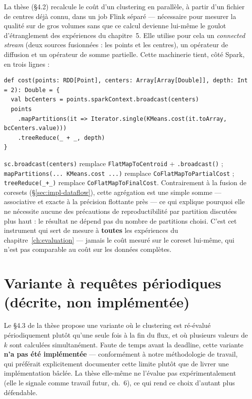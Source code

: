 La thèse (§4.2) recalcule le coût d'un clustering en parallèle, à partir
d'un fichier de centres déjà connu, dans un job Flink séparé --- nécessaire
pour mesurer la qualité sur de gros volumes sans que ce calcul devienne
lui-même le goulot d'étranglement des expériences du chapitre~5. Elle utilise
pour cela un \emph{connected stream} (deux sources fusionnées : les points
et les centres), un opérateur de diffusion et un opérateur de somme partielle.
Cette machinerie tient, côté Spark, en trois lignes :

\begin{verbatim}
def cost(points: RDD[Point], centers: Array[Array[Double]], depth: Int = 2): Double = {
  val bcCenters = points.sparkContext.broadcast(centers)
  points
    .mapPartitions(it => Iterator.single(KMeans.cost(it.toArray, bcCenters.value)))
    .treeReduce(_ + _, depth)
}
\end{verbatim}

\texttt{sc.broadcast(centers)} remplace \texttt{FlatMapToCentroid} +
\texttt{.broadcast()} ; \texttt{mapPartitions(... KMeans.cost ...)} remplace
\texttt{CoFlatMapToPartialCost} ; \texttt{treeReduce(\_+\_)} remplace
\texttt{CoFlatMapToFinalCost}. Contrairement à la fusion de coresets
(§\ref{sec:impl-dataflow}), cette agrégation est une simple somme ---
associative et exacte à la précision flottante près --- ce qui explique
pourquoi elle ne nécessite aucune des précautions de reproductibilité par
partition discutées plus haut : le résultat ne dépend pas du nombre de
partitions choisi. C'est cet instrument qui sert de mesure à
\textbf{toutes} les expériences du chapitre~\ref{ch:evaluation} --- jamais
le coût mesuré sur le coreset lui-même, qui n'est pas comparable au coût sur
les données complètes.

\section{Variante à requêtes périodiques (décrite, non implémentée)}
\label{sec:impl-requetes}

Le §4.3 de la thèse propose une variante où le clustering est ré-évalué
périodiquement plutôt qu'une seule fois à la fin du flux, et où plusieurs
valeurs de $k$ sont calculées simultanément. Faute de temps avant la
deadline, cette variante \textbf{n'a pas été implémentée} --- conformément à
notre méthodologie de travail, qui préférait explicitement documenter cette
limite plutôt que de livrer une implémentation bâclée. La thèse elle-même ne
l'évalue pas expérimentalement (elle le signale comme travail futur, ch.~6),
ce qui rend ce choix d'autant plus défendable.

